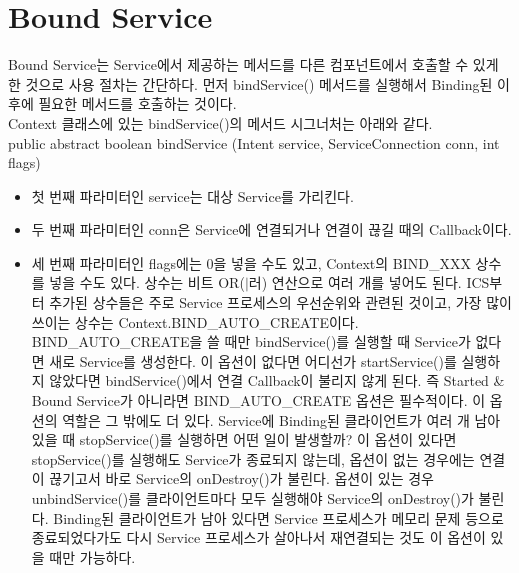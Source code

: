 \section{Bound Service}
Bound Service는 Service에서 제공하는 메서드를 다른 컴포넌트에서 호출할 수 있게 한 것으로 사용 절차는 간단하다. 
먼저 bindService() 메서드를 실행해서 Binding된 이후에 필요한 메서드를 호출하는 것이다.\\

Context 클래스에 있는 bindService()의 메서드 시그너처는 아래와 같다.\\
public abstract boolean  bindService (Intent service, ServiceConnection conn, int flags)\\
\begin{itemize}
\item 첫 번째 파라미터인 service는 대상 Service를 가리킨다.
\item 두 번째 파라미터인 conn은 Service에 연결되거나 연결이 끊길 때의 Callback이다.
\item 세 번째 파라미터인 flags에는 0을 넣을 수도 있고, Context의 BIND\_XXX 상수를 넣을 수도 있다. 상수는 비트 OR($|러$) 연산으로 여러 개를 넣어도 된다. ICS부터 추가된 상수들은 주로 Service 프로세스의 우선순위와 관련된 것이고, 가장 많이 쓰이는 상수는 Context.BIND\_AUTO\_CREATE이다.\\

BIND\_AUTO\_CREATE을 쓸 때만 bindService()를 실행할 때 Service가 없다면 새로 Service를 생성한다. 이 옵션이 없다면 어디선가 startService()를 실행하지 않았다면 bindService()에서 연결 Callback이 불리지 않게 된다.
즉 Started \& Bound Service가 아니라면 BIND\_AUTO\_CREATE 옵션은 필수적이다. 
이 옵션의 역할은 그 밖에도 더 있다. 
Service에 Binding된 클라이언트가 여러 개 남아있을 때 stopService()를 실행하면 어떤 일이 발생할까? 이 옵션이 있다면 stopService()를 실행해도 Service가 종료되지 않는데, 옵션이 없는 경우에는 연결이 끊기고서 바로 Service의 onDestroy()가 불린다.
옵션이 있는 경우 unbindService()를 클라이언트마다 모두 실행해야 Service의 onDestroy()가 불린다.
Binding된 클라이언트가 남아 있다면 Service 프로세스가 메모리 문제 등으로 종료되었다가도 다시 Service 프로세스가 살아나서 재연결되는 것도 이 옵션이 있을 때만 가능하다. 
\end{itemize}

